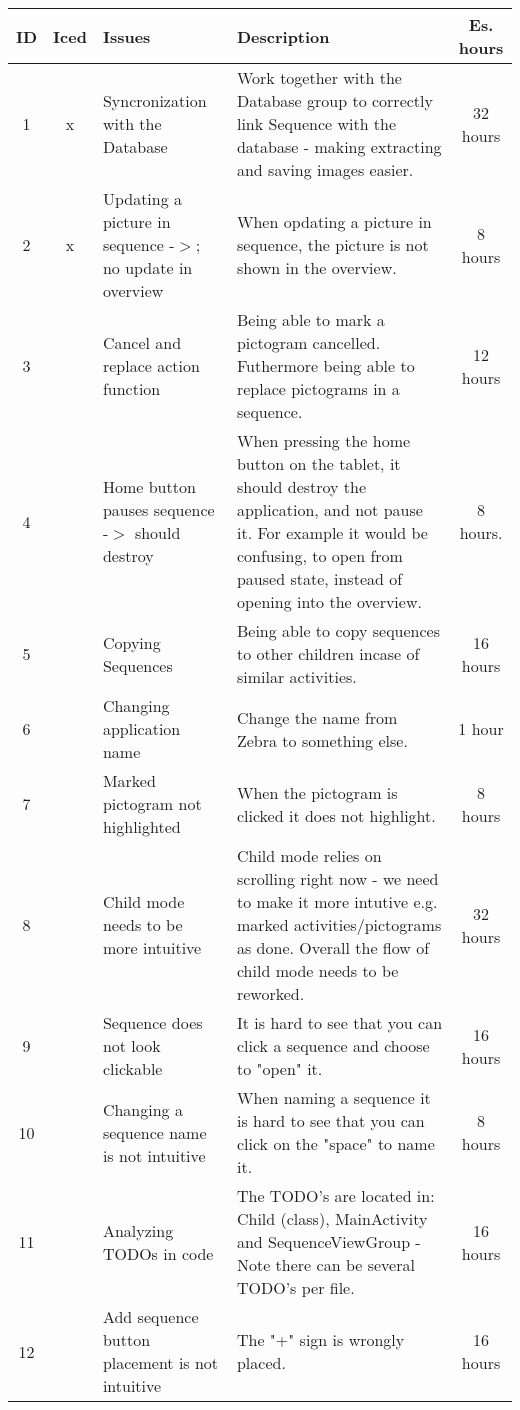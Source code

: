 \begin{longtable} { | c | c | p{5cm} | p{5cm} | c | } 
\hline
	ID 	&	Iced	&	Issues	&	Description		&	 Es. hours \\\hline
	1	& 	x	&	Syncronization with the Database		& 	Work together with the Database group to correctly link Sequence with the database - making extracting and saving images easier.	&	32 hours	\\\hline
	2	& 	x	&	Updating a picture in sequence -$>$; no update in overview	&	When opdating a picture in sequence, the picture is not shown in the overview.	&	8 hours	\\\hline
	3	& 		&	Cancel and replace action function	&	Being able to mark a pictogram cancelled. Futhermore being able to replace pictograms in a sequence.	&	12 hours \\\hline
	4	& 		&	Home button pauses sequence -$>$ should destroy	 &	When pressing the home button on the tablet, it should destroy the application, and not pause it. For example it would be confusing, to open from paused state, instead of opening into the overview.	&	8 hours.	\\\hline
	5	& 		&	Copying Sequences	&	Being able to copy sequences to other children incase of similar activities.	&	16 hours \\\hline
	6	& 		&	Changing application name	&	Change the name from Zebra to something else.	&	1 hour	\\\hline
	7	& 		&	Marked pictogram not highlighted		&	When the pictogram is clicked it does not highlight.	&	8 hours 	\\\hline
	8	& 		&	Child mode needs to be more intuitive		&	Child mode relies on scrolling right now - we need to make it more intutive e.g. marked activities/pictograms as done. Overall the flow of child mode needs to be reworked.	&	32 hours	\\\hline
	9	& 		&	Sequence does not look clickable		&	It is hard to see that you can click a sequence and choose to "open" it.	&	16 hours	\\\hline
	10	& 		&	Changing a sequence name is not intuitive	&	When naming a sequence it is hard to see that you can click on the "space" to name it.	&	8 hours	\\\hline
	11	& 		&	Analyzing TODOs in code	&	The TODO's are located in: Child (class), MainActivity and SequenceViewGroup - Note there can be several TODO's per file.		&	16 hours	\\\hline
	12	& 		&	Add sequence button placement is not intuitive	&	The "+" sign is wrongly placed.	&	16 hours 	\\\hline

\end{longtable}
